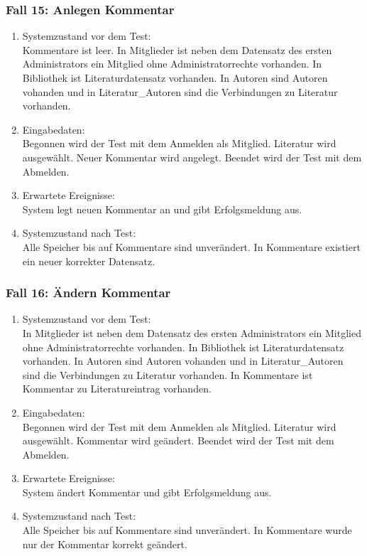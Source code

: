 \subsubsection{Fall 15: Anlegen Kommentar}
\begin{enumerate}
\item Systemzustand vor dem Test:\\
	Kommentare ist leer. In Mitglieder ist neben dem Datensatz des ersten Administrators ein Mitglied ohne Administratorrechte vorhanden. In Bibliothek ist Literaturdatensatz vorhanden. In Autoren sind Autoren vohanden und in Literatur\_Autoren sind die Verbindungen zu Literatur vorhanden.
\item Eingabedaten:\\
	Begonnen wird der Test mit dem Anmelden als Mitglied. Literatur wird ausgewählt. Neuer Kommentar wird angelegt. Beendet wird der Test mit dem Abmelden.
\item Erwartete Ereignisse:\\
	System legt neuen Kommentar an und gibt Erfolgsmeldung aus.
\item Systemzustand nach Test:\\
	Alle Speicher bis auf Kommentare sind unverändert. In Kommentare existiert ein neuer korrekter Datensatz.
\end{enumerate}

\subsubsection{Fall 16: Ändern Kommentar}
\begin{enumerate}
\item Systemzustand vor dem Test:\\
	In Mitglieder ist neben dem Datensatz des ersten Administrators ein Mitglied ohne Administratorrechte vorhanden. In Bibliothek ist Literaturdatensatz vorhanden. In Autoren sind Autoren vohanden und in Literatur\_Autoren sind die Verbindungen zu Literatur vorhanden. In Kommentare ist Kommentar zu Literatureintrag vorhanden.
\item Eingabedaten:\\
	Begonnen wird der Test mit dem Anmelden als Mitglied. Literatur wird ausgewählt. Kommentar wird geändert. Beendet wird der Test mit dem Abmelden.
\item Erwartete Ereignisse:\\
	System ändert Kommentar und gibt Erfolgsmeldung aus.
\item Systemzustand nach Test:\\
	Alle Speicher bis auf Kommentare sind unverändert. In Kommentare wurde nur der Kommentar korrekt geändert.
\end{enumerate}

